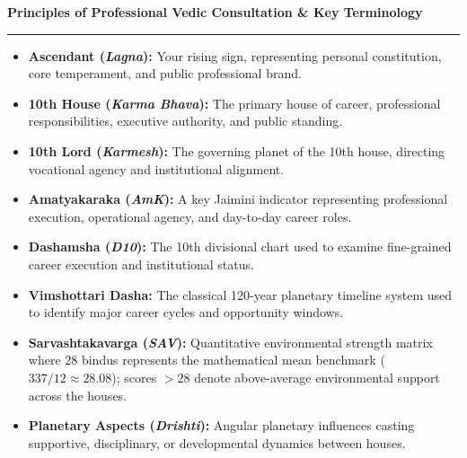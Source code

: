 \documentclass[10pt,oneside]{article}
\newcommand{\CardTitle}[1]{%
  {\sffamily\fontsize{9}{11}\selectfont\bfseries\color{DeepSlate}#1}\par
  \vspace{1mm}%
  {\textcolor{AccentGold}{\rule{18mm}{0.6pt}}}\par
  \vspace{2mm}%
}
\begin{document}
\vspace{2mm}
\begin{executivecard}
  \CardTitle{Principles of Professional Vedic Consultation \& Key Terminology}
  \sffamily\fontsize{8}{11}\selectfont
  \begin{itemize}[leftmargin=*,itemsep=1pt,parsep=0pt]
    \item \textbf{Ascendant (\textit{Lagna}):} Your rising sign, representing personal constitution, core temperament, and public professional brand.
    \item \textbf{10th House (\textit{Karma Bhava}):} The primary house of career, professional responsibilities, executive authority, and public standing.
    \item \textbf{10th Lord (\textit{Karmesh}):} The governing planet of the 10th house, directing vocational agency and institutional alignment.
    \item \textbf{Amatyakaraka (\textit{AmK}):} A key Jaimini indicator representing professional execution, operational agency, and day-to-day career roles.
    \item \textbf{Dashamsha (\textit{D10}):} The 10th divisional chart used to examine fine-grained career execution and institutional status.
    \item \textbf{Vimshottari Dasha:} The classical 120-year planetary timeline system used to identify major career cycles and opportunity windows.
    \item \textbf{Sarvashtakavarga (\textit{SAV}):} Quantitative environmental strength matrix where 28 bindus represents the mathematical mean benchmark ($337/12 \approx 28.08$); scores $> 28$ denote above-average environmental support across the houses.
    \item \textbf{Planetary Aspects (\textit{Drishti}):} Angular planetary influences casting supportive, disciplinary, or developmental dynamics between houses.
  \end{itemize}
\end{executivecard}
\clearpage











\end{document}
